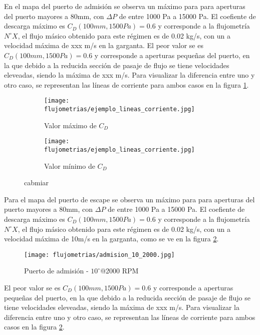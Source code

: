 En el mapa del puerto de admisión se observa un máximo para para aperturas del
puerto mayores a 80mm, con $\Delta P$ de entre 1000 Pa a 15000 Pa.
%
El coefiente de descarga máximo es $C_{D}(100mm, 1500Pa) = 0.6$ y corresponde a
la flujometría $N^{\circ} X$, el flujo másico obtenido para este régimen es de
0.02 kg/s, con un a velocidad máxima de xxx m/s en la garganta.
%
El peor valor se es $C_{D}(100mm, 1500Pa) = 0.6$ y corresponde a aperturas
pequeñas del puerto, en la que debido a la reducida sección de pasaje de flujo
se tiene velocidades eleveadas, siendo la máxima de xxx m/s.
%
Para visualizar la diferencia entre uno y otro caso, se representan las líneas
de corriente para ambos casos en la figura
\ref{fig:comparativa_lineas_corriente}.

\begin{figure}
    \centering
    \begin{subfigure}{0.4\textwidth}
        \centering
        \texttt{[image: flujometrias/ejemplo\_lineas\_corriente.jpg]}
        \caption{Valor máximo de $C_{D}$}
    \end{subfigure}
    \hfill
    \begin{subfigure}{0.4\textwidth}
        \centering
        \texttt{[image: flujometrias/ejemplo\_lineas\_corriente.jpg]}
        \caption{Valor mínimo de $C_{D}$}
    \end{subfigure}
    \caption{cabmiar}\label{fig:comparativa_lineas_corriente}
\end{figure}

Para el mapa del puerto de escape se observa un máximo para para aperturas del
puerto mayores a 80mm, con $\Delta P$ de entre 1000 Pa a 15000 Pa.
%
El coefiente de descarga máximo es $C_{D}(100mm, 1500Pa) = 0.6$ y corresponde a
la flujometría $N^{\circ} X$, el flujo másico obtenido para este régimen es de
0.02 kg/s, con un a velocidad máxima de 10m/s en la garganta, como se ve en la
figura \ref{fig:admision_10_2000.jpg}.

\begin{figure}
    \centering
    \texttt{[image: flujometrias/admision\_10\_2000.jpg]}
    \caption{Puerto de admisión - $10^{\circ}$@2000 RPM}\label{fig:admision_10_2000.jpg}
\end{figure}

El peor valor se es $C_{D}(100mm, 1500Pa) = 0.6$ y corresponde a aperturas
pequeñas del puerto, en la que debido a la reducida sección de pasaje de flujo
se tiene velocidades eleveadas, siendo la máxima de xxx m/s.
%
Para visualizar la diferencia entre uno y otro caso, se representan las líneas
de corriente para ambos casos en la figura \ref{fig:admision_10_2000.jpg}.

